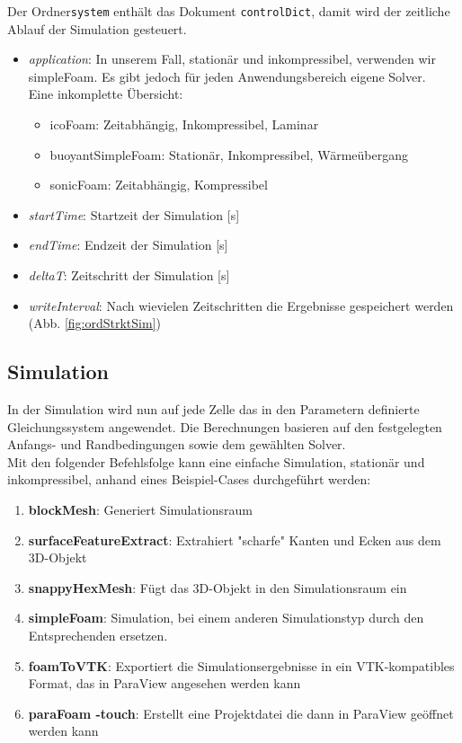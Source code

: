 Der Ordner\texttt{system} enthält das Dokument \texttt{controlDict}, damit wird der zeitliche Ablauf der Simulation gesteuert.

\begin{itemize}
    \item \textit{application}: In unserem Fall, stationär und inkompressibel, 
    verwenden wir simpleFoam. Es gibt jedoch für jeden Anwendungsbereich eigene Solver.\\
    Eine inkomplette Übersicht:
    \begin{itemize}
        \item icoFoam: Zeitabhängig, Inkompressibel, Laminar
        \item buoyantSimpleFoam: Stationär, Inkompressibel, Wärmeübergang
        \item sonicFoam: Zeitabhängig, Kompressibel
    \end{itemize}
    \item \textit{startTime}: Startzeit der Simulation [s]
    \item \textit{endTime}: Endzeit der Simulation [s]
    \item \textit{deltaT}: Zeitschritt der Simulation [s]
    \item \textit{writeInterval}: Nach wievielen Zeitschritten die Ergebnisse gespeichert werden (Abb. \ref{fig:ordStrktSim})
\end{itemize}



\subsection{Simulation \label{openfoam:section:Simulation}}
In der Simulation wird nun auf jede Zelle das in den Parametern definierte Gleichungssystem angewendet.
Die Berechnungen basieren auf den festgelegten Anfangs- und Randbedingungen sowie dem gewählten Solver.\\

Mit den folgender Befehlsfolge kann eine einfache Simulation, stationär und inkompressibel, anhand eines Beispiel-Cases durchgeführt werden:

\begin{enumerate}
    \item \textbf{blockMesh}: Generiert Simulationsraum
    \item \textbf{surfaceFeatureExtract}: Extrahiert "scharfe" Kanten und Ecken aus dem 3D-Objekt
    \item \textbf{snappyHexMesh}: Fügt das 3D-Objekt in den Simulationsraum ein
    \item \textbf{simpleFoam}: Simulation, bei einem anderen Simulationstyp durch den Entsprechenden ersetzen.
    \item \textbf{foamToVTK}: Exportiert die Simulationsergebnisse in ein VTK-kompatibles Format, das in ParaView angesehen werden kann
    \item \textbf{paraFoam -touch}: Erstellt eine Projektdatei die dann in ParaView geöffnet werden kann
\end{enumerate}

